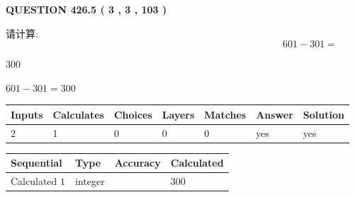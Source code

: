 \documentclass{ctexart}
\begin{document}
   
  
\vspace{0.2in}
  
{\textbf{\Large{QUESTION
426.5 
 ( 3 , 3 , 103 )
}}}
  
  
 
请计算:
\begin{equation}
601 -   %
301 = \nonumber
\end{equation}
 
 
 
\noindent{}
 
 

300
 
 
\noindent{}
 
 

 
 
 
\noindent{}
 
 

$ %
601 -  %
301=   %
300$
 
 
\noindent{}
 
 

 
   
   
   
   
\noindent\begin{tabular}{|l|l|l|l|l|l|l|}
 \hline
Inputs & Calculates & Choices & Layers & Matches & Answer & Solution \\ \hline
 2  & 
 1  & 
 0
  & 
 0  & 
 0  & 
  yes & 
  yes 
  \\ \hline
 \end{tabular}
   
   
   
   
\noindent{}
   
   
  
  
\noindent\begin{tabular}{|l|l|l|l|}
\hline
 Sequential & Type & Accuracy & Calculated \\ 
\hline
 
 
  Calculated $  1 $ & integer &  & 
  $ 300 $ 
 \\  \hline  
 \end{tabular}
   
\end{document}
